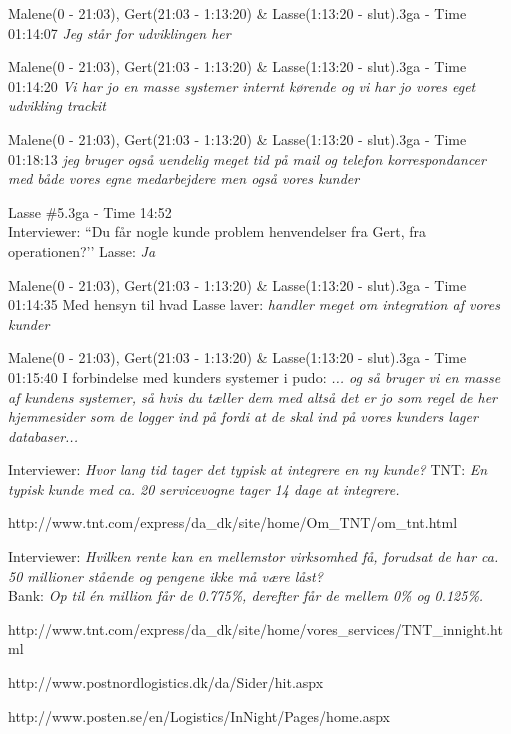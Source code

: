 \begin{thebibliography}{9}
	Malene(0 - 21:03), Gert(21:03 - 1:13:20) \& Lasse(1:13:20 - slut).3ga - Time 01:14:07
	\textit{Jeg står for udviklingen her}
 
	Malene(0 - 21:03), Gert(21:03 - 1:13:20) \& Lasse(1:13:20 - slut).3ga - Time 01:14:20
	\textit{Vi har jo en masse systemer internt kørende og vi har jo vores eget udvikling trackit}

	Malene(0 - 21:03), Gert(21:03 - 1:13:20) \& Lasse(1:13:20 - slut).3ga - Time 01:18:13
	\textit{jeg bruger også uendelig meget tid på mail og telefon korrespondancer med både vores egne medarbejdere men også vores kunder}

	Lasse \#5.3ga - Time 14:52 \\
	Interviewer: ``Du får nogle kunde problem henvendelser fra Gert, fra operationen?’’
Lasse: \textit{Ja}

	Malene(0 - 21:03), Gert(21:03 - 1:13:20) \& Lasse(1:13:20 - slut).3ga - Time 01:14:35
	Med hensyn til hvad Lasse laver: \textit{handler meget om integration af vores kunder}

	Malene(0 - 21:03), Gert(21:03 - 1:13:20) \& Lasse(1:13:20 - slut).3ga - Time 01:15:40
	I forbindelse med kunders systemer i pudo: \textit{... og så bruger vi en masse af kundens systemer, så hvis du tæller dem med altså det er jo som regel de her hjemmesider som de logger ind på fordi at de skal ind på vores kunders lager databaser...}

	Interviewer: \textit{Hvor lang tid tager det typisk at integrere en ny kunde?}
	TNT: \textit{En typisk kunde med ca. 20 servicevogne tager 14 dage at integrere.}

	http://www.tnt.com/express/da\_dk/site/home/Om\_TNT/om\_tnt.html

	Interviewer: \textit{Hvilken rente kan en mellemstor virksomhed få, forudsat de har ca. 50 millioner stående og pengene ikke må være låst?}\\
	Bank: \textit{Op til én million får de 0.775\%, derefter får de mellem 0\% og 0.125\%.}

	http://www.tnt.com/express/da\_dk/site/home/vores\_services/TNT\_innight.html

	http://www.postnordlogistics.dk/da/Sider/hit.aspx

	http://www.posten.se/en/Logistics/InNight/Pages/home.aspx


\end{thebibliography}
